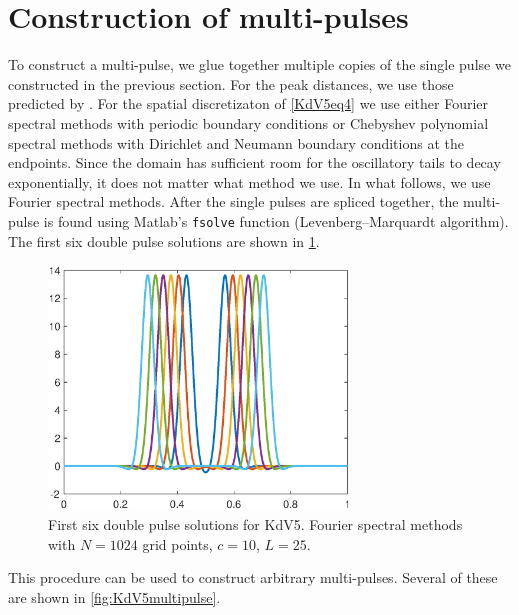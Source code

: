 \documentclass[thesis.tex]{subfiles}
\begin{document}
\section{Construction of multi-pulses}

To construct a multi-pulse, we glue together multiple copies of the single pulse we constructed in the previous section. For the peak distances, we use those predicted by \cite{SandstedeStrut}. For the spatial discretizaton of \eqref{KdV5eq4} we use either Fourier spectral methods with periodic boundary conditions or Chebyshev polynomial spectral methods with Dirichlet and Neumann boundary conditions at the endpoints. Since the domain has sufficient room for the oscillatory tails to decay exponentially, it does not matter what method we use. In what follows, we use Fourier spectral methods. After the single pulses are spliced together, the multi-pulse is found using Matlab's \texttt{fsolve} function (Levenberg–Marquardt algorithm). The first six double pulse solutions are shown in \cref{fig:KdV5doublepulse}.

\begin{figure}
\begin{center}
\includegraphics[width=8cm]{images/kdv5numerics/double10.eps}
\caption{First six double pulse solutions for KdV5. Fourier spectral methods with $N = 1024$ grid points, $c = 10$, $L = 25$.}
\label{fig:KdV5doublepulse}
\end{center}
\end{figure}

This procedure can be used to construct arbitrary multi-pulses. Several of these are shown in \cref{fig:KdV5multipulse}.
\end{document}
